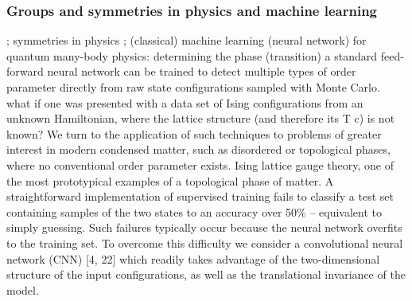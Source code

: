 \subsubsection{Groups and symmetries in physics and machine learning}
\cite{kondorGroupTheoreticalMethods2008};
symmetries in physics
\cite{bogatskiyLorentzGroupEquivariant2020}
\cite{bogatskiySymmetryGroupEquivariant2022};
(classical) machine learning (neural network) for quantum many-body physics:
determining the phase (transition) 
a standard feed-forward neural network can be trained to detect multiple types of order parameter directly from raw state conﬁgurations sampled with Monte Carlo.
what if one was presented with a data set of Ising conﬁgurations from an unknown Hamiltonian, where the lattice structure (and therefore its T c) is not known?
We turn to the application of such techniques to problems of greater interest in modern condensed matter, such as disordered or topological phases, where no conventional order parameter exists.
Ising lattice gauge theory, one of the most prototypical examples of a topological phase of matter.
A straightforward implementation of supervised training fails to classify a test set containing samples of the two states to an accuracy over 50\% – equivalent to simply guessing. Such failures typically occur because the neural network overﬁts to the training set. To overcome this diﬃculty we consider a convolutional neural network (CNN) [4, 22] which readily takes advantage of the two-dimensional structure of the input conﬁgurations, as well as the translational invariance of the model.
\cite{carrasquillaMachineLearningPhases2017}
\cite{carleoSolvingQuantumManyBody2017}

